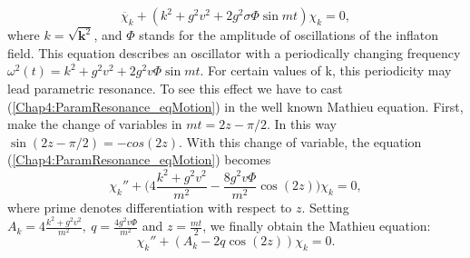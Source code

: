 \documentclass[11pt,a4paper,twoside]{book}
\begin{document}
\begin{equation}
	\label{Chap4:ParamResonance_eqMotion}
	\ddot{\chi_{k}} + (k^{2} + g^{2}v^{2} + 2g^{2}\sigma \Phi \sin mt)\chi_{k} = 0,
\end{equation}
where $ k=\sqrt{\textbf{k}^{2}} $, and $\Phi$ stands for the amplitude of oscillations of the inflaton field. This equation describes an oscillator with a periodically changing frequency $ \omega^{2}(t) = k^{2} + g^{2}v^{2} + 2g^{2}v\Phi \sin mt $. For certain values of k, this periodicity may lead parametric resonance. To see this effect we have to cast (\ref{Chap4:ParamResonance_eqMotion}) in the well known Mathieu equation. First, make the change of variables in $ mt=2z-\pi/2 $. In this way $ \sin (2z-\pi/2)=-cos (2z)  $. With this change of variable, the equation (\ref{Chap4:ParamResonance_eqMotion}) becomes
\begin{equation}
\label{Chap4:ParamResonance_eqMotion2}
\chi_{k}'' + \Bigg(4\frac{k^{2} + g^{2}v^{2}}{m^{2}}-\frac{8g^{2}v\Phi}{m^{2}} \cos(2z)\Bigg)\chi_{k} = 0,
\end{equation}
where prime denotes differentiation with respect to $ z $.
  Setting $ A_{k}=4\frac{k^{2} + g^{2}v^{2}}{m^{2}},\  q=\frac{4g^{2}v\Phi}{m^{2}} $ and $ z=\frac{mt}{2} $, we finally obtain the Mathieu equation:
\begin{equation}
	\label{Chap4:ParamResonance_MathieuEquation}
	\chi_{k}''+(A_{k} - 2q\cos(2z))\chi_{k}=0.
\end{equation}
\end{document}
